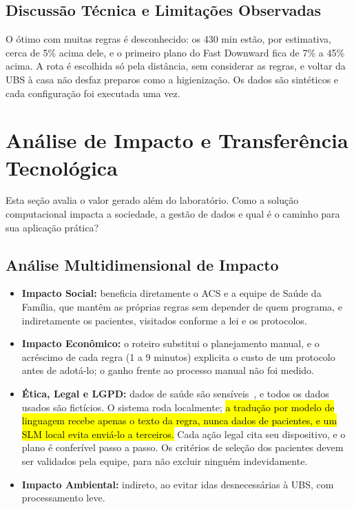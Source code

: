 \documentclass[11pt,a4paper]{article}
\newcommand{\pendente}[1]{\hl{#1}}
\begin{document}
\subsection{Discussão Técnica e Limitações Observadas}
O ótimo com muitas regras é desconhecido: os 430 min estão, por estimativa, cerca de 5\% acima dele, e o primeiro plano do Fast Downward fica de 7\% a 45\% acima. A rota é escolhida só pela distância, sem considerar as regras, e voltar da UBS à casa não desfaz preparos como a higienização. Os dados são sintéticos e cada configuração foi executada uma vez.

\section{Análise de Impacto e Transferência Tecnológica}

\begin{instrucao}
Esta seção avalia o valor gerado além do laboratório. Como a solução computacional impacta a sociedade, a gestão de dados e qual é o caminho para sua aplicação prática?
\end{instrucao}

\subsection{Análise Multidimensional de Impacto}
\begin{itemize}
    \item \textbf{Impacto Social:} beneficia diretamente o ACS e a equipe de Saúde da Família, que mantêm as próprias regras sem depender de quem programa, e indiretamente os pacientes, visitados conforme a lei e os protocolos.
    \item \textbf{Impacto Econômico:} o roteiro substitui o planejamento manual, e o acréscimo de cada regra (1 a 9 minutos) explicita o custo de um protocolo antes de adotá-lo; o ganho frente ao processo manual não foi medido.
    \item \textbf{Ética, Legal e LGPD:} dados de saúde são sensíveis~\cite{lgpd}, e todos os dados usados são fictícios. O sistema roda localmente; \pendente{a tradução por modelo de linguagem recebe apenas o texto da regra, nunca dados de pacientes, e um SLM local evita enviá-lo a terceiros.} Cada ação legal cita seu dispositivo, e o plano é conferível passo a passo. Os critérios de seleção dos pacientes devem ser validados pela equipe, para não excluir ninguém indevidamente.
    \item \textbf{Impacto Ambiental:} indireto, ao evitar idas desnecessárias à UBS, com processamento leve.
\end{itemize}
\end{document}
